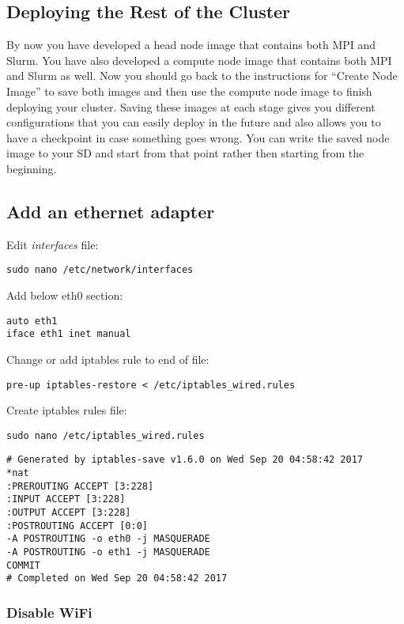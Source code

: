 \documentclass[]{article}
\begin{document}
\subsection{Deploying the Rest of the
Cluster}\label{deploying-the-rest-of-the-cluster}

By now you have developed a head node image that contains both MPI and
Slurm. You have also developed a compute node image that contains both
MPI and Slurm as well. Now you should go back to the instructions for
``Create Node Image'' to save both images and then use the compute node
image to finish deploying your cluster. Saving these images at each
stage gives you different configurations that you can easily deploy in
the future and also allows you to have a checkpoint in case something
goes wrong. You can write the saved node image to your SD and start from
that point rather then starting from the beginning.

\subsection{Add an ethernet adapter}\label{add-an-ethernet-adapter}

Edit \emph{interfaces} file:

\texttt{sudo\ nano\ /etc/network/interfaces}

Add below eth0 section:

\begin{verbatim}
auto eth1
iface eth1 inet manual
\end{verbatim}

Change or add iptables rule to end of file:

\texttt{pre-up\ iptables-restore\ \textless{}\ /etc/iptables\_wired.rules}

Create iptables rules file:

\texttt{sudo\ nano\ /etc/iptables\_wired.rules}

\begin{verbatim}
# Generated by iptables-save v1.6.0 on Wed Sep 20 04:58:42 2017
*nat
:PREROUTING ACCEPT [3:228]
:INPUT ACCEPT [3:228]
:OUTPUT ACCEPT [3:228]
:POSTROUTING ACCEPT [0:0]
-A POSTROUTING -o eth0 -j MASQUERADE
-A POSTROUTING -o eth1 -j MASQUERADE
COMMIT
# Completed on Wed Sep 20 04:58:42 2017
\end{verbatim}

\subsubsection{Disable WiFi}\label{disable-wifi}
\end{document}
